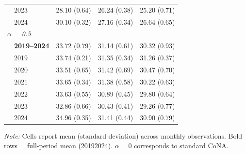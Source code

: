 \begin{table}[htbp]
\begin{tabular}{llrrr}
 & 2023 & 28.10 (0.64) & 26.24 (0.38) & 25.20 (0.71) \\
 & 2024 & 30.10 (0.32) & 27.16 (0.34) & 26.64 (0.65) \\
\midrule
\multicolumn{5}{l}{\textit{$\alpha$ = 0.5}} \\
 & \textbf{2019–2024} & 33.72 (0.79) & 31.14 (0.61) & 30.32 (0.93) \\
 & 2019 & 33.74 (0.21) & 31.35 (0.34) & 31.26 (0.37) \\
 & 2020 & 33.51 (0.65) & 31.42 (0.69) & 30.47 (0.70) \\
 & 2021 & 33.65 (0.34) & 31.38 (0.58) & 30.22 (0.63) \\
 & 2022 & 33.63 (0.55) & 30.89 (0.45) & 29.80 (0.64) \\
 & 2023 & 32.86 (0.66) & 30.43 (0.41) & 29.26 (0.77) \\
 & 2024 & 34.96 (0.35) & 31.41 (0.44) & 30.90 (0.79) \\
\bottomrule
\end{tabular}
\begin{minipage}{\linewidth}
\vspace{2pt}\footnotesize
\textit{Note:} Cells report mean (standard deviation) across monthly observations. Bold rows = full-period mean (2019\textendash{}2024). $\alpha = 0$ corresponds to standard CoNA.
\end{minipage}
\end{table}
